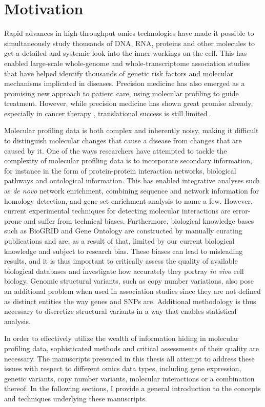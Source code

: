 \section{Motivation}
Rapid advances in high-throughput omics technologies have made it possible to simultaneously study thousands of DNA, RNA, proteins and other molecules to get a detailed and systemic look into the inner workings on the cell. This has enabled large-scale whole-genome and whole-transcriptome association studies that have helped identify thousands of genetic risk factors and molecular mechanisms implicated in diseases. Precision medicine has also emerged as a promising new approach to patient care, using molecular profiling to guide treatment. However, while precision medicine has shown great promise already, especially in cancer therapy \cite{Kato2017}, translational success is still limited \cite{Ginsburg2018}.

Molecular profiling data is both complex and inherently noisy, making it difficult to distinguish molecular changes that cause a disease from changes that are caused by it.
One of the ways researchers have attempted to tackle the complexity of molecular profiling data is to incorporate secondary information, for instance in the form of protein-protein interaction networks, biological pathways and ontological information. This has enabled integrative analyses such as \emph{de novo} network enrichment, combining sequence and network information for homology detection, and gene set enrichment analysis to name a few.
However, current experimental techniques for detecting molecular interactions are error-prone and suffer from technical biases. Furthermore, biological knowledge bases such as BioGRID \cite{Stark2006} and Gene Ontology \cite{Ashburner2000} are constructed by manually curating publications and are, as a result of that, limited by our current biological knowledge and subject to research bias. These biases can lead to misleading results, and it is thus important to critically assess the quality of available biological databases and investigate how accurately they portray \emph{in vivo} cell biology. Genomic structural variants, such as copy number variations, also pose an additional problem when used in association studies since they are not defined as distinct entities the way genes and SNPs are. Additional methodology is thus necessary to discretize structural variants in a way that enables statistical analysis.

In order to effectively utilize the wealth of information hiding in molecular profiling data, sophisticated methods and critical assessments of their quality are necessary. The manuscripts presented in this thesis all attempt to address these issues with respect to different omics data types, including gene expression, genetic variants, copy number variants, molecular interactions or a combination thereof. In the following sections, I provide a general introduction to the concepts and techniques underlying these manuscripts.

